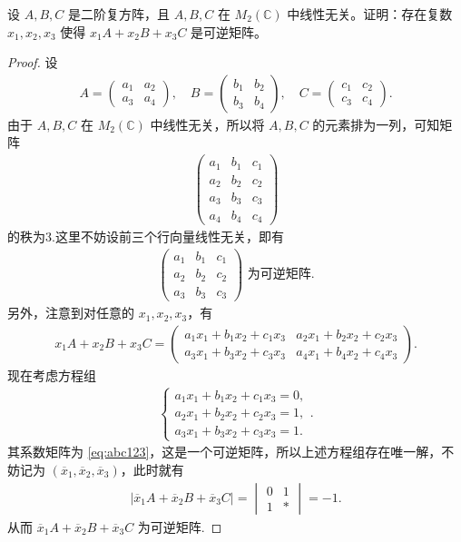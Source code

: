 \documentclass[../../main.tex]{subfiles}%
\begin{document}
\begin{example}
设 $A, B, C$ 是二阶复方阵，且 $A, B, C$ 在 $M_2(\mathbb{C})$ 中线性无关。证明：存在复数 $x_1, x_2, x_3$ 使得 $x_1A + x_2B + x_3C$ 是可逆矩阵。
\end{example}
\begin{proof}
设
\begin{align*}
A = \begin{pmatrix} a_1 & a_2 \\ a_3 & a_4 \end{pmatrix}, \quad 
B = \begin{pmatrix} b_1 & b_2 \\ b_3 & b_4 \end{pmatrix}, \quad 
C = \begin{pmatrix} c_1 & c_2 \\ c_3 & c_4 \end{pmatrix}.
\end{align*}
由于 $A, B, C$ 在 $M_2(\mathbb{C})$ 中线性无关，所以将 $A, B, C$ 的元素排为一列，可知矩阵
\begin{align*}
\begin{pmatrix} a_1 & b_1 & c_1 \\ a_2 & b_2 & c_2 \\ a_3 & b_3 & c_3 \\ a_4 & b_4 & c_4 \end{pmatrix}
\end{align*}
的秩为3.这里不妨设前三个行向量线性无关，即有
\begin{align}
\begin{pmatrix} a_1 & b_1 & c_1 \\ a_2 & b_2 & c_2 \\ a_3 & b_3 & c_3 \end{pmatrix} \text{ 为可逆矩阵.} \label{eq:abc123}
\end{align}
另外，注意到对任意的 $x_1, x_2, x_3$，有
\begin{align*}
x_1A + x_2B + x_3C = \begin{pmatrix} a_1x_1 + b_1x_2 + c_1x_3 & a_2x_1 + b_2x_2 + c_2x_3 \\ a_3x_1 + b_3x_2 + c_3x_3 & a_4x_1 + b_4x_2 + c_4x_3 \end{pmatrix}.
\end{align*}
现在考虑方程组
\begin{align*}
\begin{cases} 
a_1x_1 + b_1x_2 + c_1x_3 = 0, \\ 
a_2x_1 + b_2x_2 + c_2x_3 = 1, \\ 
a_3x_1 + b_3x_2 + c_3x_3 = 1.
\end{cases}.
\end{align*}
其系数矩阵为 \eqref{eq:abc123}，这是一个可逆矩阵，所以上述方程组存在唯一解，不妨记为 $(\overline{x}_1, \overline{x}_2, \overline{x}_3)$，此时就有
\begin{align*}
|\overline{x}_1A + \overline{x}_2B + \overline{x}_3C| = \begin{vmatrix} 0 & 1 \\ 1 & * \end{vmatrix} = -1.
\end{align*}
从而 $\overline{x}_1A + \overline{x}_2B + \overline{x}_3C$ 为可逆矩阵.
\end{proof}
\end{document}
